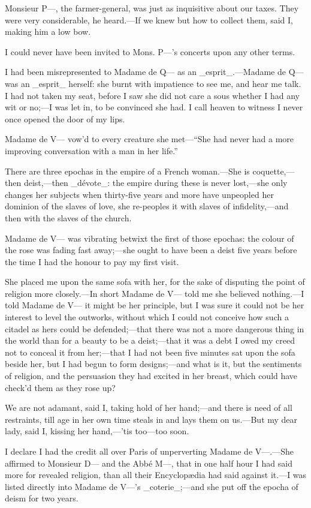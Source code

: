 \documentclass[twoside]{article}
\begin{document}
Monsieur P—, the farmer-general, was just as inquisitive about our taxes.
They were very considerable, he heard.—If we knew but how to collect
them, said I, making him a low bow.

I could never have been invited to Mons. P—’s concerts upon any other
terms.

I had been misrepresented to Madame de Q— as an _esprit_.—Madame de Q—
was an _esprit_ herself: she burnt with impatience to see me, and hear me
talk.  I had not taken my seat, before I saw she did not care a sous
whether I had any wit or no;—I was let in, to be convinced she had.  I
call heaven to witness I never once opened the door of my lips.

Madame de V— vow’d to every creature she met—“She had never had a more
improving conversation with a man in her life.”

There are three epochas in the empire of a French woman.—She is
coquette,—then deist,—then _dévote_: the empire during these is never
lost,—she only changes her subjects when thirty-five years and more have
unpeopled her dominion of the slaves of love, she re-peoples it with
slaves of infidelity,—and then with the slaves of the church.

Madame de V— was vibrating betwixt the first of those epochas: the colour
of the rose was fading fast away;—she ought to have been a deist five
years before the time I had the honour to pay my first visit.

She placed me upon the same sofa with her, for the sake of disputing the
point of religion more closely.—In short Madame de V— told me she
believed nothing.—I told Madame de V— it might be her principle, but I
was sure it could not be her interest to level the outworks, without
which I could not conceive how such a citadel as hers could be
defended;—that there was not a more dangerous thing in the world than for
a beauty to be a deist;—that it was a debt I owed my creed not to conceal
it from her;—that I had not been five minutes sat upon the sofa beside
her, but I had begun to form designs;—and what is it, but the sentiments
of religion, and the persuasion they had excited in her breast, which
could have check’d them as they rose up?

We are not adamant, said I, taking hold of her hand;—and there is need of
all restraints, till age in her own time steals in and lays them on
us.—But my dear lady, said I, kissing her hand,—’tis too—too soon.

I declare I had the credit all over Paris of unperverting Madame de
V—.—She affirmed to Monsieur D— and the Abbé M—, that in one half hour I
had said more for revealed religion, than all their Encyclopædia had said
against it.—I was listed directly into Madame de V—’s _coterie_;—and she
put off the epocha of deism for two years.
\end{document}
